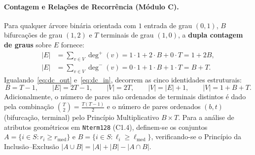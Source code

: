 \documentclass[11pt, a4paper]{article}
\begin{document}
\paragraph{Contagem e Relações de Recorrência (Módulo C).}
Para qualquer árvore binária orientada com $1$ entrada de grau $(0, 1)$, $B$ bifurcações de grau $(1, 2)$ e $T$ terminais de grau $(1, 0)$, a \textbf{dupla contagem de graus} sobre $E$ fornece:
\begin{align}
  |E| &= \sum_{v \in V} \deg^+(v) = 1\cdot 1 + 2\cdot B + 0\cdot T = 1 + 2B, \label{eq:dc_out}\\
  |E| &= \sum_{v \in V} \deg^-(v) = 0\cdot 1 + 1\cdot B + 1\cdot T = B + T. \label{eq:dc_in}
\end{align}
Igualando~\eqref{eq:dc_out} e~\eqref{eq:dc_in}, decorrem as cinco identidades estruturais:
\begin{equation}
  B = T - 1, \qquad |E| = 2T - 1, \qquad |V| = 2T, \qquad |V| = |E| + 1, \qquad |V| = 1 + B + T.
  \label{eq:identidades_c1}
\end{equation}
Adicionalmente, o número de pares não ordenados de terminais distintos é dado pela combinação $\binom{T}{2} = \frac{T(T-1)}{2}$ e o número de pares ordenados $(b, t)$ (bifurcação, terminal) pelo Princípio Multiplicativo $B \times T$. Para a análise de atributos geométricos em \texttt{Nterm128} (C1.4), definem-se os conjuntos $A = \{i \in S : r_i \ge r_{\mathrm{med}}\}$ e $B = \{i \in S : \ell_i \ge \ell_{\mathrm{med}}\}$, verificando-se o Princípio da Inclusão--Exclusão $|A \cup B| = |A| + |B| - |A \cap B|$.
\end{document}
